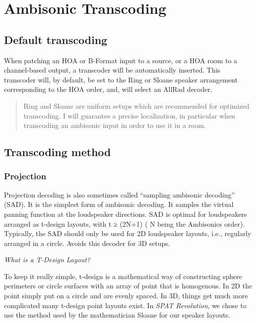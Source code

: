 \documentclass[
  letterpaper,
  DIV=11,
  numbers=noendperiod]{scrreport}
\begin{document}
\hypertarget{ambisonic-transcoding}{%
\chapter{Ambisonic Transcoding}\label{ambisonic-transcoding}}

\hypertarget{default-transcoding}{%
\section{Default transcoding}\label{default-transcoding}}

When patching an HOA or B-Format input to a source, or a HOA room to a
channel-based output, a transcoder will be automatically inserted. This
transcoder will, by default, be set to the Ring or Sloane speaker
arrangement corresponding to the HOA order, and, will select an AllRad
decoder.

\begin{quote}
Ring and Sloane are uniform setups which are recommended for optimized
transcoding. I will guarantee a precise localization, in particular when
transcoding an ambisonic input in order to use it in a room.
\end{quote}

\hypertarget{transcoding-method}{%
\section{Transcoding method}\label{transcoding-method}}

\hypertarget{projection}{%
\subsection{Projection}\label{projection}}

Projection decoding is also sometimes called ``sampling ambisonic
decoding'' (SAD). It is the simplest form of ambisonic decoding. It
samples the virtual panning function at the loudspeaker directions. SAD
is optimal for loudspeakers arranged as t-design layouts, with t ≥
(2N+1) ( N being the Ambisonics order). Typically, the SAD should only
be used for 2D loudspeaker layouts, i.e., regularly arranged in a
circle. Avoids this decoder for 3D setups.

\emph{What is a T-Design Layout?}

To keep it really simple, t-design is a mathematical way of constructing
sphere perimeters or circle surfaces with an array of point that is
homogenous. In 2D the point simply put on a circle and are evenly
spaced. In 3D, things get much more complicated many t-design point
layouts exist. In \emph{SPAT Revolution}, we chose to use the method
used by the mathematician Sloane for our speaker layouts.
\end{document}
